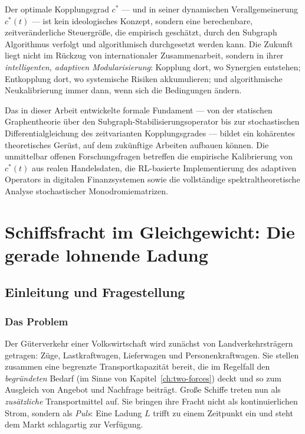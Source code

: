 \documentclass[a4paper, 12pt, twoside, openright]{report}
\theoremstyle{definition}
\theoremstyle{definition}
\begin{document}
Der optimale Kopplungsgrad $c^*$ --- und in seiner dynamischen Verallgemeinerung $c^*(t)$
--- ist kein ideologisches Konzept, sondern eine berechenbare, zeitveränderliche Steuergröße,
die empirisch geschätzt, durch den Subgraph Algorithmus verfolgt und algorithmisch
durchgesetzt werden kann. Die Zukunft liegt nicht im Rückzug von internationaler
Zusammenarbeit, sondern in ihrer \emph{intelligenten, adaptiven Modularisierung}:
Kopplung dort, wo Synergien entstehen; Entkopplung dort, wo systemische Risiken akkumulieren;
und algorithmische Neukalibrierung immer dann, wenn sich die Bedingungen ändern.

Das in dieser Arbeit entwickelte formale Fundament --- von der statischen Graphentheorie
über den Subgraph-Stabilisierungsoperator bis zur stochastischen Differentialgleichung
des zeitvarianten Kopplungsgrades --- bildet ein kohärentes theoretisches Gerüst, auf dem
zukünftige Arbeiten aufbauen können. Die unmittelbar offenen Forschungsfragen betreffen
die empirische Kalibrierung von $c^*(t)$ aus realen Handelsdaten, die RL-basierte
Implementierung des adaptiven Operators in digitalen Finanzsystemen sowie die
vollständige spektraltheoretische Analyse stochastischer Monodromiematrizen.

\cleardoublepage

\chapter{Schiffsfracht im Gleichgewicht: Die gerade lohnende Ladung}
\label{ch:ship-freight}

\section{Einleitung und Fragestellung}

\subsection{Das Problem}

Der Güterverkehr einer Volkswirtschaft wird zunächst von Landverkehrsträgern getragen:
Züge, Lastkraftwagen, Lieferwagen und Personenkraftwagen. Sie stellen zusammen eine
begrenzte Transportkapazität bereit, die im Regelfall den \emph{begründeten} Bedarf
(im Sinne von Kapitel~\ref{ch:two-forces}) deckt und so zum Ausgleich von Angebot und
Nachfrage beiträgt. Große Schiffe treten nun als \emph{zusätzliche} Transportmittel auf.
Sie bringen ihre Fracht nicht als kontinuierlichen Strom, sondern als \emph{Puls}: Eine
Ladung $L$ trifft zu einem Zeitpunkt ein und steht dem Markt schlagartig zur Verfügung.
\end{document}
